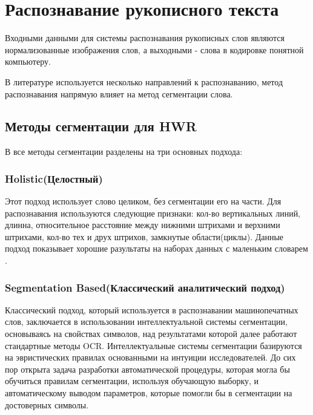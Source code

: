\chapter{Распознавание рукописного текста} \label{chapt5}

Входными данными для системы распознавания рукописных слов являются нормализованные изображения слов, а выходными - слова в кодировке понятной компьютеру.

В литературе используется несколько направлений к распознаванию, метод распознавания напрямую влияет на метод сегментации слова. 

\section{Методы сегментации для HWR} \label{sect5_1}

В \cite{casey1996survey} все методы сегментации разделены на три основных подхода:


\subsection{Holistic(Целостный)} \label{subsect5_1_1}

Этот подход использует слово целиком, без сегментации его на части. Для распознавания используются следующие признаки: кол-во вертикальных линий, длинна, относительное расстояние между нижними штрихами и верхними штрихами, кол-во тех и друх штрихов, замкнутые области(циклы). Данные подход показывает хорошие разультаты на наборах данных с маленьким словарем \cite{rehman2012off}.


\subsection{Segmentation Based(Классический аналитический подход)} \label{subsect5_1_2}

Классический подход, который используется в распознавании машинопечатных слов, заключается в использовании интеллектуальной системы сегментации, основываясь на свойствах символов, над результатами которой далее работают стандартные методы OCR. Интеллектуальные системы сегментации базируются на эвристических правилах основанными на интуиции исследователей. До сих пор открыта задача разработки автоматической процедуры, которая могла бы обучиться правилам сегментации, используя обучающую выборку, и автоматическому выводом параметров, которые помогли бы в сегментации на достоверных символы. \cite{bunke2003recognition}


